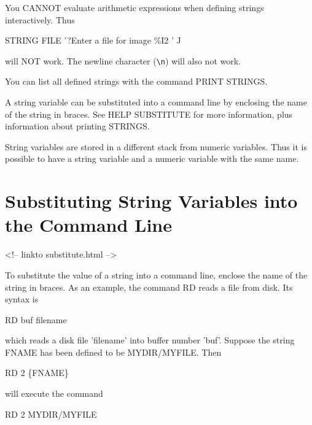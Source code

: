 You CANNOT evaluate arithmetic expressions when defining strings
interactively.  Thus
\begin{hanging}
  \item{STRING FILE '?Enter a file for image \%I2 ' J}
\end{hanging}
will NOT work. The newline character (\verb+\n+) will also not work.

You can list all defined strings with the command PRINT STRINGS.

A string variable can be substituted into a command line by enclosing the
name of the string in braces.  See HELP SUBSTITUTE for more information,
plus information about printing STRINGS.

String variables are stored in a different stack from numeric variables.
Thus it is possible to have a string variable and a numeric variable with
the same name.

\section{Substituting String Variables into the Command Line}
\begin{rawhtml}
<!-- linkto substitute.html -->
\end{rawhtml}


To substitute the value of a string into a command line, enclose the name
of the string in braces.  As an example, the command RD reads a file from
disk.  Its syntax is
\begin{hanging}
  \item{RD buf filename}
\end{hanging}
which reads a disk file 'filename' into buffer number 'buf'.  Suppose the
string FNAME has been defined to be MYDIR/MYFILE.  Then
\begin{hanging}
  \item{RD 2 \{FNAME\}}
\end{hanging}
will execute the command
\begin{hanging}
  \item{RD 2 MYDIR/MYFILE}
\end{hanging}

